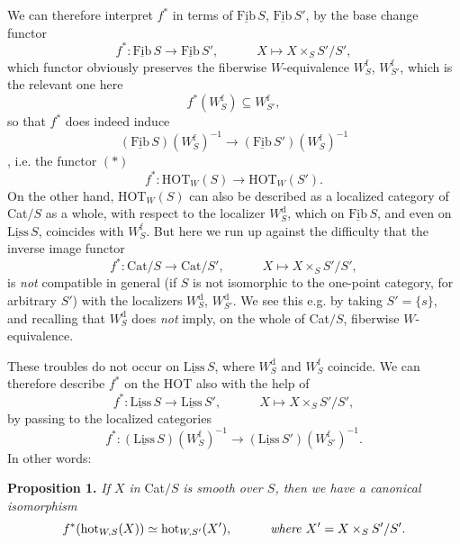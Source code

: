\documentclass[11pt]{article}
\newcommand{\msp}[1]{\marginpar{\footnotesize [#1]}}
\newcommand{\Fib}{\underline{\mathrm{Fib}}\,}
\newcommand{\Liss}{\underline{\mathrm{Liss}}}
\newcommand{\HOT}{\mathrm{HOT}}
\newcommand{\hot}{\mathrm{hot}}
\newcommand{\Cat}{\mathrm{Cat}}
\begin{document}
We can therefore interpret $f^*$ in terms of $\Fib S$, $\Fib S'$, by the base change functor
\[f^* : \Fib S \longrightarrow \Fib S', \qquad\quad X \longmapsto X \times_S S'/S',\]
which functor obviously preserves the fiberwise $W$-equivalence $W_S^{\mathrm{f}}$, $W_{S'}^{\mathrm{f}}$, which is the relevant one here
\[f^*(W_S^{\mathrm{f}}) \subseteq W_{S'}^{\mathrm{f}},\]
so that $f^*$ does indeed induce
\[(\Fib S)(W_S^{\mathrm{f}})^{-1} \longrightarrow (\Fib S')(W_S^{\mathrm{f}})^{-1}\]
,
\msp{page 118}
i.e. the functor $(*)$
\[f^* : \HOT_W(S) \longrightarrow \HOT_W(S').\]
On the other hand, $\HOT_W(S)$ can also be described as a localized category of Cat$/S$ as a whole, with respect to the localizer $W_S^{\mathrm{d}}$, which on $\Fib S$, and even on $\Liss\,S$, coincides with $W_S^{\mathrm{f}}$. But here we run up against the difficulty that the inverse image functor
\[f^* : \Cat/S \longrightarrow \Cat/S', \qquad\quad X \longmapsto X \times_S S'/S',\]
is \textit{not} compatible in general (if $S$ is not isomorphic to the one-point category, for arbitrary $S'$) with the localizers $W_S^{\mathrm{d}}$, $W_{S'}^{\mathrm{d}}$. We see this e.g. by taking $S' = \{s\}$, and recalling that $W_S^{\mathrm{d}}$ does \textit{not} imply, on the whole of Cat$/S$, fiberwise $W$-equivalence.

These troubles do not occur on $\Liss\,S$, where $W_S^{\mathrm{d}}$ and $W_S^{\mathrm{f}}$ coincide. We can therefore describe $f^*$ on the HOT also with the help of %
\[f^* : \Liss\,S \longrightarrow \Liss\,S', \qquad\quad X \longmapsto X \times_S S'/S',\]
by passing to the localized categories
\[f^* : (\Liss\,S)(W_S^{\mathrm{f}})^{-1} \longrightarrow (\Liss\,S')(W_{S'}^{\mathrm{f}})^{-1}.\]
In other words:

\textbf{Proposition 1.} \textit{If $X$ in} Cat$/S$ \textit{is smooth over $S$, then we have a canonical isomorphism}
\[f^*(\hot_{W,S}(X)) \simeq \hot_{W,S'}(X'), \qquad\quad \text{\textit{where} } X' = X \times_S S'/S'.\]
\end{document}
